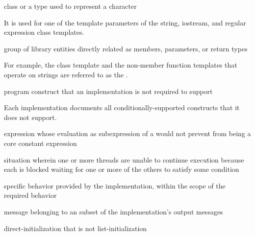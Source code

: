 %
class or a type used to
represent a character

\begin{defnote}
It is used for one of the template parameters of the string,
iostream, and regular expression class templates.
\end{defnote}

%
group of library entities directly related as members, parameters, or
return types

\begin{defnote}
For example, the class template
and the non-member
function templates
that operate on
strings are referred to as the
.
\end{defnote}

%
program construct that an implementation is not required to support

\begin{defnote}
Each implementation documents all conditionally-supported
constructs that it does not support.
\end{defnote}

%
expression whose evaluation as subexpression of a
 would not prevent 
from being a core constant expression

%
situation wherein
one or more threads are unable to continue execution because each is
blocked waiting for one or more of the others to satisfy some condition

%
specific behavior provided by the implementation,
within the scope of the required behavior

%
message belonging to an  subset of the
implementation's output messages

%
direct-initialization
that is not list-initialization

